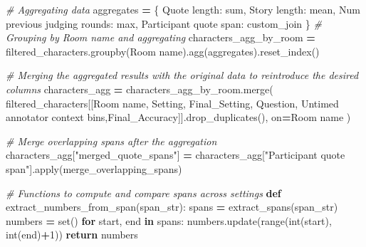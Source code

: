 \documentclass[
]{article}
\newenvironment{Shaded}{\begin{snugshade}}{\end{snugshade}}
\newcommand{\BuiltInTok}[1]{#1}
\newcommand{\CommentTok}[1]{\textcolor[rgb]{0.56,0.35,0.01}{\textit{#1}}}
\newcommand{\ControlFlowTok}[1]{\textcolor[rgb]{0.13,0.29,0.53}{\textbf{#1}}}
\newcommand{\DecValTok}[1]{\textcolor[rgb]{0.00,0.00,0.81}{#1}}
\newcommand{\KeywordTok}[1]{\textcolor[rgb]{0.13,0.29,0.53}{\textbf{#1}}}
\newcommand{\NormalTok}[1]{#1}
\newcommand{\OperatorTok}[1]{\textcolor[rgb]{0.81,0.36,0.00}{\textbf{#1}}}
\newcommand{\StringTok}[1]{\textcolor[rgb]{0.31,0.60,0.02}{#1}}
\begin{document}
\begin{Shaded}
\begin{Highlighting}[]
\CommentTok{\# Aggregating data}
\NormalTok{aggregates }\OperatorTok{=}\NormalTok{ \{}
    \StringTok{\textquotesingle{}Quote length\textquotesingle{}}\NormalTok{: }\StringTok{\textquotesingle{}sum\textquotesingle{}}\NormalTok{,}
    \StringTok{\textquotesingle{}Story length\textquotesingle{}}\NormalTok{: }\StringTok{\textquotesingle{}mean\textquotesingle{}}\NormalTok{,}
    \StringTok{\textquotesingle{}Num previous judging rounds\textquotesingle{}}\NormalTok{: }\StringTok{\textquotesingle{}max\textquotesingle{}}\NormalTok{,}
    \StringTok{\textquotesingle{}Participant quote span\textquotesingle{}}\NormalTok{: custom\_join}
\NormalTok{\}}
\CommentTok{\# Grouping by \textquotesingle{}Room name\textquotesingle{} and aggregating}
\NormalTok{characters\_agg\_by\_room }\OperatorTok{=}\NormalTok{ filtered\_characters.groupby(}\StringTok{\textquotesingle{}Room name\textquotesingle{}}\NormalTok{).agg(aggregates).reset\_index()}

\CommentTok{\# Merging the aggregated results with the original data to reintroduce the desired columns}
\NormalTok{characters\_agg }\OperatorTok{=}\NormalTok{ characters\_agg\_by\_room.merge(}
\NormalTok{    filtered\_characters[[}\StringTok{\textquotesingle{}Room name\textquotesingle{}}\NormalTok{, }\StringTok{\textquotesingle{}Setting\textquotesingle{}}\NormalTok{, }\StringTok{\textquotesingle{}Final\_Setting\textquotesingle{}}\NormalTok{, }\StringTok{\textquotesingle{}Question\textquotesingle{}}\NormalTok{, }\StringTok{\textquotesingle{}Untimed annotator context bins\textquotesingle{}}\NormalTok{,}\StringTok{\textquotesingle{}Final\_Accuracy\textquotesingle{}}\NormalTok{]].drop\_duplicates(),}
\NormalTok{    on}\OperatorTok{=}\StringTok{\textquotesingle{}Room name\textquotesingle{}}
\NormalTok{)}

\CommentTok{\# Merge overlapping spans after the aggregation}
\NormalTok{characters\_agg[}\StringTok{"merged\_quote\_spans"}\NormalTok{] }\OperatorTok{=}\NormalTok{ characters\_agg[}\StringTok{"Participant quote span"}\NormalTok{].}\BuiltInTok{apply}\NormalTok{(merge\_overlapping\_spans)}

\CommentTok{\# Functions to compute and compare spans across settings}
\KeywordTok{def}\NormalTok{ extract\_numbers\_from\_span(span\_str):}
\NormalTok{    spans }\OperatorTok{=}\NormalTok{ extract\_spans(span\_str)}
\NormalTok{    numbers }\OperatorTok{=} \BuiltInTok{set}\NormalTok{()}
    \ControlFlowTok{for}\NormalTok{ start, end }\KeywordTok{in}\NormalTok{ spans:}
\NormalTok{        numbers.update(}\BuiltInTok{range}\NormalTok{(}\BuiltInTok{int}\NormalTok{(start), }\BuiltInTok{int}\NormalTok{(end)}\OperatorTok{+}\DecValTok{1}\NormalTok{))}
    \ControlFlowTok{return}\NormalTok{ numbers}


\end{Highlighting}
\end{Shaded}
\end{document}
